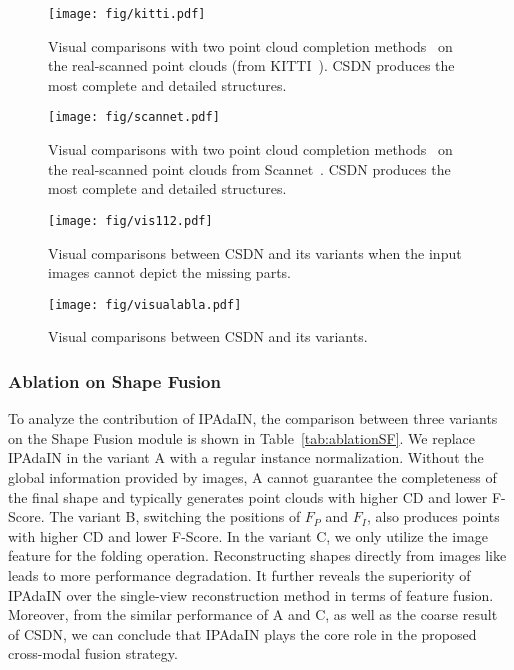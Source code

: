 \begin{figure}[h]
  \centering
  \texttt{[image: fig/kitti.pdf]}
  \caption{Visual comparisons with two point cloud completion methods~\cite{zhang2021view,yu2021pointr} on the real-scanned point clouds (from KITTI~\cite{geiger2013vision}). CSDN produces the most complete and detailed structures.}
  \label{fig:kitti}
\end{figure}  
\begin{figure}[ht]
  \centering
  \texttt{[image: fig/scannet.pdf]}
  \caption{Visual comparisons with two point cloud completion methods~\cite{zhang2021view,yu2021pointr} on the real-scanned point clouds from Scannet~\cite{dai2017scannet}. CSDN produces the most complete and detailed structures.}
  \label{fig:scannet}
\end{figure} 
\begin{figure*}[ht] 
  \centering
  \texttt{[image: fig/vis112.pdf]}
  \caption{Visual comparisons between CSDN and its variants when the input images cannot depict the missing parts.}
  \label{fig:vis112}
\end{figure*}
\begin{figure*}[ht] 
  \centering
  \texttt{[image: fig/visualabla.pdf]}
  \caption{Visual comparisons between CSDN and its variants.}
  \label{fig:visualabla}
\end{figure*}

\subsubsection{Ablation on Shape Fusion}
To analyze the contribution of IPAdaIN, the comparison between three variants on the Shape Fusion module is shown in Table~\ref{tab:ablationSF}. We replace IPAdaIN in the variant A with a regular instance normalization. Without the global information provided by images, A cannot guarantee the completeness of the final shape and typically generates point clouds with higher CD and lower F-Score. The variant B, switching the positions of \emph{$F_P$} and \emph{$F_I$}, also produces points with higher CD and lower F-Score. In the variant C, we only utilize the image feature for the folding operation. Reconstructing shapes directly from images like \cite{zhang2021view} leads to more performance degradation. It further reveals the superiority of IPAdaIN over the single-view reconstruction method in terms of feature fusion. Moreover, from the similar performance of A and C, as well as the coarse result of CSDN, we can conclude that IPAdaIN plays the core role in the proposed cross-modal fusion strategy.

